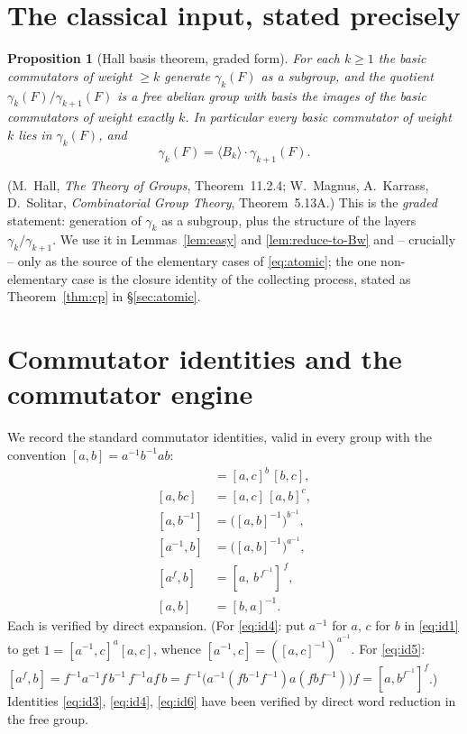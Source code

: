 \documentclass{amsart}
\newtheorem{proposition}{Proposition}
\theoremstyle{definition}
\theoremstyle{remark}
\begin{document}
\section{The classical input, stated precisely}\label{sec:input}

\begin{proposition}[Hall basis theorem, graded form]\label{prop:hall}
For each $k\ge 1$ the basic commutators of weight $\ge k$ generate $\gamma_k(F)$
\emph{as a subgroup}, and the quotient $\gamma_k(F)/\gamma_{k+1}(F)$ is a free
abelian group with basis the images of the basic commutators of weight exactly
$k$. In particular every basic commutator of weight $k$ lies in $\gamma_k(F)$, and
\begin{equation}\label{eq:hall-decomp}
\gamma_k(F)=\langle B_k\rangle\cdot\gamma_{k+1}(F).
\end{equation}
\end{proposition}

\noindent
(M.\ Hall, \emph{The Theory of Groups}, Theorem~11.2.4; W.\ Magnus, A.\ Karrass,
D.\ Solitar, \emph{Combinatorial Group Theory}, Theorem~5.13A.) This is the
\emph{graded} statement: generation of $\gamma_k$ as a subgroup, plus the
structure of the layers $\gamma_k/\gamma_{k+1}$. We use it in
Lemmas~\ref{lem:easy} and \ref{lem:reduce-to-Bw} and -- crucially -- only as the
source of the elementary cases of \eqref{eq:atomic}; the one non-elementary case
is the closure identity of the collecting process, stated as
Theorem~\ref{thm:cp} in \S\ref{sec:atomic}.

\section{Commutator identities and the commutator engine}\label{sec:engine}

We record the standard commutator identities, valid in every group with the
convention $[a,b]=a^{-1}b^{-1}ab$:
\begin{align}
[ab,c]&=[a,c]^{b}\,[b,c], \label{eq:id1}\\
[a,bc]&=[a,c]\,[a,b]^{c}, \label{eq:id2}\\
[a,b^{-1}]&=\big([a,b]^{-1}\big)^{b^{-1}}, \label{eq:id3}\\
[a^{-1},b]&=\big([a,b]^{-1}\big)^{a^{-1}}, \label{eq:id4}\\
[a^{f},b]&=[a,\,b^{\,f^{-1}}]^{\,f}, \label{eq:id5}\\
[a,b]&=[b,a]^{-1}. \label{eq:id6}
\end{align}
Each is verified by direct expansion. (For \eqref{eq:id4}: put $a^{-1}$ for $a$,
$c$ for $b$ in \eqref{eq:id1} to get $1=[a^{-1},c]^{a}[a,c]$, whence
$[a^{-1},c]=([a,c]^{-1})^{a^{-1}}$. For \eqref{eq:id5}:
$[a^f,b]=f^{-1}a^{-1}f\,b^{-1}\,f^{-1}af\,b
=f^{-1}\big(a^{-1}(fb^{-1}f^{-1})a(fbf^{-1})\big)f=[a,b^{f^{-1}}]^{f}$.)
Identities \eqref{eq:id3}, \eqref{eq:id4}, \eqref{eq:id6} have been verified by
direct word reduction in the free group.
\end{document}
